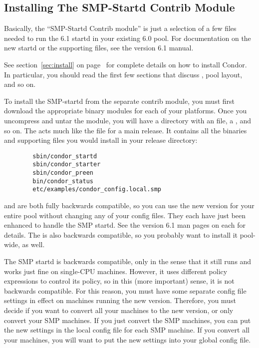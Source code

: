 \subsection{\label{sec:SMP-install}Installing The SMP-Startd Contrib
Module} 

Basically, the ``SMP-Startd Contrib module'' is just a selection of a
few files needed to run the 6.1 startd in your existing 6.0 pool.
For documentation on the new startd or the supporting files, see the
version 6.1 manual.

See section~\ref{sec:install} on page~\pageref{sec:install} for
complete details on how to install Condor.
In particular, you should read the first few sections that discuss
, pool layout, and so on.

To install the SMP-startd from the separate contrib module, you must
first download the appropriate binary modules for each of your
platforms.  
Once you uncompress and untar the module, you will have a directory
with an  file, a , and so on.
The  acts much like the  file for a
main release.
It contains all the binaries and supporting files you would install in
your release directory:
\begin{verbatim}
        sbin/condor_startd
        sbin/condor_starter
        sbin/condor_preen
        bin/condor_status
        etc/examples/condor_config.local.smp
\end{verbatim}

 and  are both fully backwards
compatible, so you can use the new version for your entire pool
without changing any of your config files.  
They each have just been enhanced to handle the SMP startd.
See the version 6.1 man pages on each for details.
The  is also backwards compatible, so you probably
want to install it pool-wide, as well.

The SMP startd is backwards compatible, only in the sense that it
still runs and works just fine on single-CPU machines.
However, it uses different policy expressions to control its policy,
so in this (more important) sense, it is not backwards compatible.
For this reason, you must have some separate config file settings in
effect on machines running the new version.
Therefore, you must decide if you want to convert all your machines to
the new version, or only convert your SMP machines.
If you just convert the SMP machines, you can put the new settings in
the local config file for each SMP machine.
If you convert all your machines, you will want to put the new
settings into your global config file.

